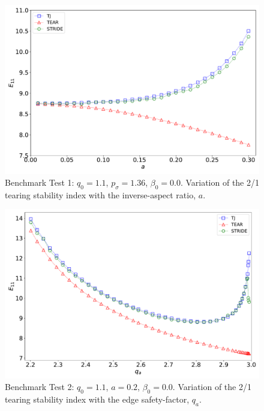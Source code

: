 \documentclass[12pt,prb,aps]{revtex4-1}
\begin{document}
\newpage
\begin{figure}
\centerline{\includegraphics[width=\textwidth]{Test1.pdf}}
\caption{Benchmark Test 1: $q_0=1.1$, $p_\sigma=1.36$, $\beta_0=0.0$. Variation of the  2/1 tearing stability index with the inverse-aspect ratio, $a$. }
\end{figure}

\newpage
\begin{figure}
\centerline{\includegraphics[width=\textwidth]{Test2.pdf}}
\caption{Benchmark Test 2: $q_0=1.1$, $a=0.2$, $\beta_0=0.0$. Variation of the 2/1 tearing stability index with  the edge safety-factor, $q_a$. }
\end{figure}
\end{document}
